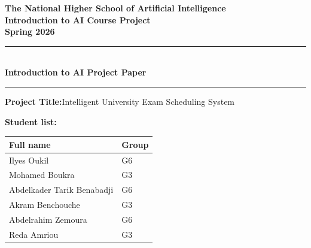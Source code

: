 \begin{titlepage}
  \centering
  \vspace*{1cm}

  {\large\bfseries
    The National Higher School of Artificial Intelligence\\[0.3em]
    Introduction to AI Course Project\\[0.3em]
    Spring 2026
  }

  \vspace{1.8cm}
  \rule{\linewidth}{1pt}\\[0.5em]
  {\Large\bfseries Introduction to AI Project Paper}\\[0.5em]
  \rule{\linewidth}{1pt}

  \vspace{1.2cm}
  \noindent\textbf{\large Project Title:}\enspace Intelligent University Exam Scheduling System \underline{\hspace{9.6cm}}

  \vspace{1.2cm}
  \noindent\textbf{Student list:}

  \vspace{0.5em}
  \noindent
  \begin{tabular}{|p{9cm}|p{4.5cm}|}
    \hline
    \rule{0pt}{11pt}\textbf{Full name} & \textbf{Group}\\[2pt]
    \hline
    \rule{0pt}{16pt} Ilyes Oukil & G6 \\[5pt]\hline
    \rule{0pt}{16pt} Mohamed Boukra & G3 \\[5pt]\hline
    \rule{0pt}{16pt} Abdelkader Tarik Benabadji & G6 \\[5pt]\hline
    \rule{0pt}{16pt} Akram Benchouche & G3 \\[5pt]\hline
    \rule{0pt}{16pt} Abdelrahim Zemoura & G6 \\[5pt]\hline
    \rule{0pt}{16pt} Reda Amriou & G3 \\[5pt]\hline
  \end{tabular}
\end{titlepage}

\newpage
\thispagestyle{fancy}
\tableofcontents

\newpage
\setcounter{page}{1}

